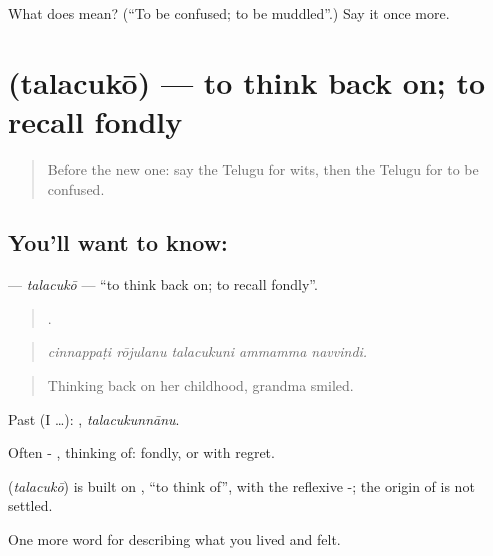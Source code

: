 \begin{tcolorbox}[breakable,colback=teal!4,colframe=teal!35!black,title={Before you move on}]
What does  mean? (\textquotedblleft{}To be confused; to be muddled\textquotedblright{}.) Say it once more.
\end{tcolorbox}
\section[\texorpdfstring{\te{తలచుకో} (talacukō)}{తలచుకో (talacukō)}]{ (talacukō) — to think back on; to recall fondly}

\label{lesson:TE-C511-talacuko}



\begin{quote}
Before the new one: say the Telugu for wits, then the Telugu for to be confused.
\end{quote}

\subsection*{You'll want to know: }
\textbf{} — \emph{talacukō} — \textquotedblleft{}to think back on; to recall fondly\textquotedblright{}.

\begin{quote}
    .
\end{quote}

\begin{quote}
\emph{cinnappaṭi rōjulanu talacukuni ammamma navvindi.}
\end{quote}

\begin{quote}
Thinking back on her childhood, grandma smiled.
\end{quote}

Past (I …): , \emph{talacukunnānu}.

Often - , thinking of: fondly, or with regret.

\begin{cousinweb}
\textbf{} (\emph{talacukō}) is built on , \textquotedblleft{}to think of\textquotedblright{}, with the reflexive -; the origin of  is not settled.
\end{cousinweb}

\begin{grammarlens}[title={What you've built}]
One more word for describing what you lived and felt.
\end{grammarlens}

